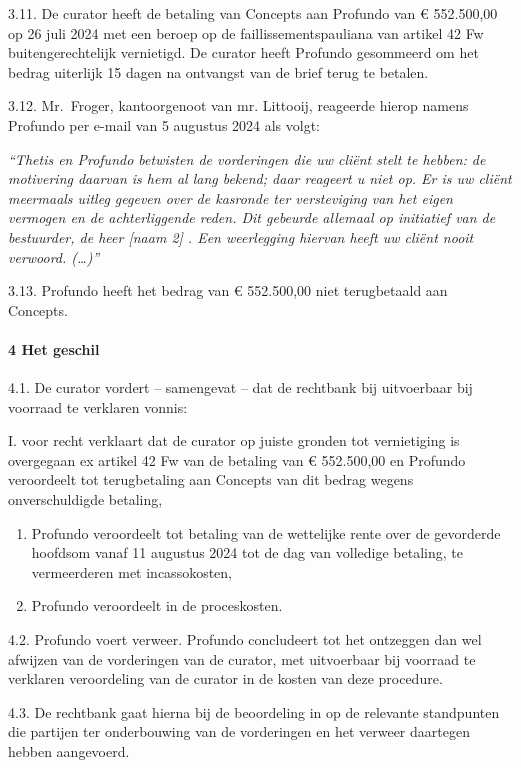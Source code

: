 \documentclass[
  dutch,
  a4paper,
]{article}
\begin{document}
3.11. De curator heeft de betaling van Concepts aan Profundo van € 552.500,00 op 26 juli 2024 met een beroep op de faillissementspauliana van artikel 42 Fw buitengerechtelijk vernietigd. De curator heeft Profundo gesommeerd om het bedrag uiterlijk 15 dagen na ontvangst van de brief terug te betalen.

3.12. Mr.~Froger, kantoorgenoot van mr. Littooij, reageerde hierop namens Profundo per e-mail van 5 augustus 2024 als volgt:

\emph{``Thetis en Profundo betwisten de vorderingen die uw cliënt stelt te hebben: de motivering daarvan is hem al lang bekend; daar reageert u niet op. Er is uw cliënt meermaals uitleg gegeven over de kasronde ter versteviging van het eigen vermogen en de achterliggende reden. Dit gebeurde allemaal op initiatief van de bestuurder, de heer {[}naam 2{]} . Een weerlegging hiervan heeft uw cliënt nooit verwoord. (\ldots)''}

3.13. Profundo heeft het bedrag van € 552.500,00 niet terugbetaald aan Concepts.

\paragraph{4 Het geschil}\label{het-geschil-1}

4.1. De curator vordert -- samengevat -- dat de rechtbank bij uitvoerbaar bij voorraad te verklaren vonnis:

I. voor recht verklaart dat de curator op juiste gronden tot vernietiging is overgegaan ex artikel 42 Fw van de betaling van € 552.500,00 en Profundo veroordeelt tot terugbetaling aan Concepts van dit bedrag wegens onverschuldigde betaling,

\begin{enumerate}
\def\labelenumi{\Roman{enumi}.}
\setcounter{enumi}{1}
\item
  Profundo veroordeelt tot betaling van de wettelijke rente over de gevorderde hoofdsom vanaf 11 augustus 2024 tot de dag van volledige betaling, te vermeerderen met incassokosten,
\item
  Profundo veroordeelt in de proceskosten.
\end{enumerate}

4.2. Profundo voert verweer. Profundo concludeert tot het ontzeggen dan wel afwijzen van de vorderingen van de curator, met uitvoerbaar bij voorraad te verklaren veroordeling van de curator in de kosten van deze procedure.

4.3. De rechtbank gaat hierna bij de beoordeling in op de relevante standpunten die partijen ter onderbouwing van de vorderingen en het verweer daartegen hebben aangevoerd.
\end{document}
